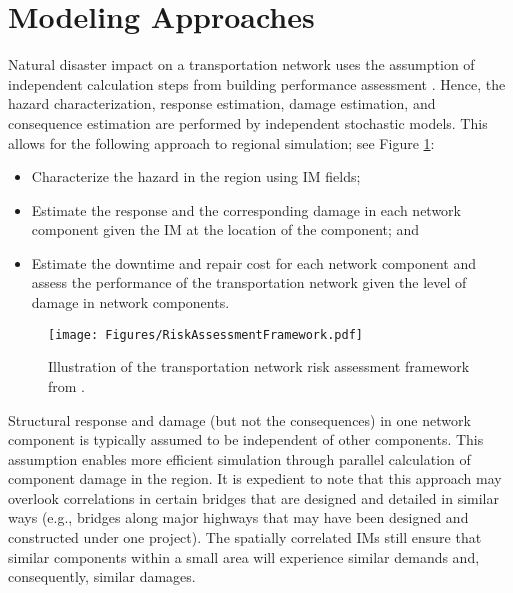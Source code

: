 \section{Modeling Approaches}
\label{sec:perf_transport_methods}

Natural disaster impact on a transportation network uses the assumption of independent calculation steps from building performance assessment \citep{chang2000transportation, kiremidjian2006pacific, miller2015ground}. Hence, the hazard characterization, response estimation, damage estimation, and consequence estimation are performed by independent stochastic models. This allows for the following approach to regional simulation; see Figure \ref{fig:perf_TranspFramework}:

\begin{itemize}
    \item Characterize the hazard in the region using IM fields;

    \item Estimate the response and the corresponding damage in each network component given the IM at the location of the component; and

    \item Estimate the downtime and repair cost for each network component and assess the performance of the transportation network given the level of damage in network components.
\end{itemize}

\begin{figure}[htb]
    \centering
    \texttt{[image: Figures/RiskAssessmentFramework.pdf]}
    \caption{Illustration of the transportation network risk assessment framework from \citet{miller2015estimating}.}
    \label{fig:perf_TranspFramework}
\end{figure}

Structural response and damage (but not the consequences) in one network component is typically assumed to be independent of other components. This assumption enables more efficient simulation through parallel calculation of component damage in the region. It is expedient to note that this approach may overlook correlations in certain bridges that are designed and detailed in similar ways (e.g., bridges along major highways that may have been designed and constructed under one project). The spatially correlated IMs still ensure that similar components within a small area will experience similar demands and, consequently, similar damages.

